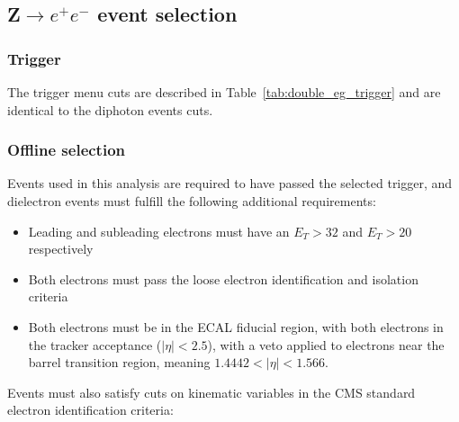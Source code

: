 \subsection{Z$\rightarrow e^+e^-$ event selection}

\subsubsection{Trigger}

The trigger menu cuts are described in Table~\ref{tab:double_eg_trigger} and are identical to the diphoton events cuts.

\subsubsection{Offline selection}

Events used in this analysis are required to have passed the selected trigger, and dielectron events must fulfill the following additional requirements:

\begin{itemize}
    \item Leading and subleading electrons must have an $E_T > 32$ and $E_T > 20$ respectively
    \item Both electrons must pass the loose electron identification and isolation criteria
    \item Both electrons must be in the ECAL fiducial region, with both electrons in the tracker acceptance ($|\eta| < 2.5$), with a veto applied to electrons near the barrel transition region, meaning $1.4442 < |\eta| < 1.566$. 
\end{itemize}

Events must also satisfy cuts on kinematic variables in the CMS standard electron identification criteria:

